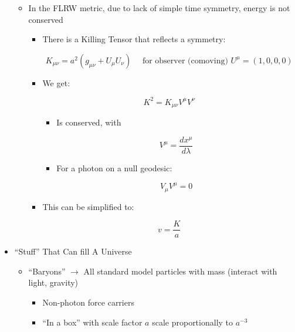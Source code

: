 \begin{itemize}
\begin{itemize}
      \item In the FLRW metric, due to lack of simple time symmetry, energy is not conserved

        \begin{itemize}

          \item There is a Killing Tensor that reflects a symmetry:

            $$K_{\mu\nu}=a^2(g_{\mu\nu}+U_{\mu}U_{\nu})\quad\text{ for observer (comoving) $U^{\mu}=(1,0,0,0)$}$$

          \item We get:

            $$K^2=K_{\mu\nu}V^{\mu}V^{\nu}$$

            \begin{itemize}

              \item Is conserved, with

                $$V^{\mu}=\frac{dx^{\mu}}{d\lambda}$$

              \item For a photon on a null geodesic:

                $$V_{\mu}V^{\mu}=0$$

            \end{itemize}

          \item This can be simplified to:

            $$v=\frac{K}{a}$$

        \end{itemize}

    \end{itemize}

  \item ``Stuff'' That Can fill A Universe

    \begin{itemize}

      \item ``Baryons'' $\to$ All standard model particles with mass (interact with light, gravity)

        \begin{itemize}

          \item Non-photon force carriers

          \item ``In a box'' with scale factor $a$ scale proportionally to $a^{-3}$


\end{itemize}
\end{itemize}
\end{itemize}
